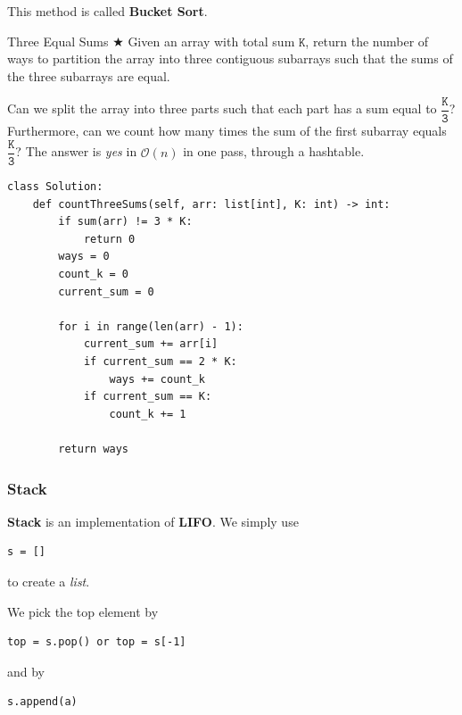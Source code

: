 \documentclass{article}
\begin{document}
This method is called \textbf{Bucket Sort}.

\vspace{2ex}

\begin{Question}{Three Equal Sums $\bigstar$}
Given an array with total sum $\texttt{K}$, return the number of ways to partition the array into three contiguous subarrays such that the sums of the three subarrays are equal.
\end{Question}

Can we split the array into three parts such that each part has a sum equal to $\dfrac{\texttt K}{\texttt3}$? Furthermore, can we count how many times the sum of the first subarray equals $\dfrac{\texttt K}{\texttt3}$? The answer is \emph{yes} in $\mathcal O(n)$ in one pass, through a hashtable.

\begin{lstlisting}[style=python]
class Solution:
    def countThreeSums(self, arr: list[int], K: int) -> int:
        if sum(arr) != 3 * K:
            return 0
        ways = 0
        count_k = 0
        current_sum = 0
        
        for i in range(len(arr) - 1):
            current_sum += arr[i]
            if current_sum == 2 * K:
                ways += count_k
            if current_sum == K:
                count_k += 1
                
        return ways
\end{lstlisting}

\subsubsection{Stack}

\textbf{Stack} is an implementation of \textbf{LIFO}. We simply use

\begin{lstlisting}[style=python]
s = []
\end{lstlisting}

to create a \emph{list}.

We pick the top element by

\begin{lstlisting}[style=python]
top = s.pop() or top = s[-1]
\end{lstlisting}

and by

\begin{lstlisting}[style=python]
s.append(a)
\end{lstlisting}
\end{document}
